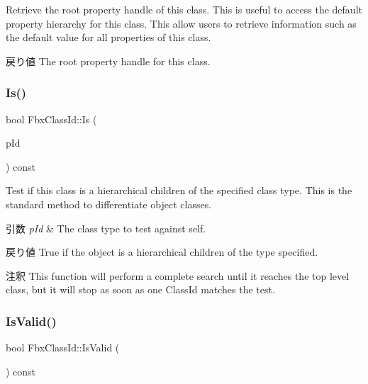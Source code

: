 Retrieve the root property handle of this class. This is useful to access the default property hierarchy for this class. This allow users to retrieve information such as the default value for all properties of this class. \begin{DoxyReturn}{戻り値}
The root property handle for this class. 
\end{DoxyReturn}
\mbox{\label{class_fbx_class_id_a276315faecc3a540664b49f6ba73b542}} 
\subsubsection{\texorpdfstring{Is()}{Is()}}
{\footnotesize\ttfamily bool Fbx\+Class\+Id\+::\+Is (\begin{DoxyParamCaption}\item[{const \hyperlink{class_fbx_class_id}{Fbx\+Class\+Id} \&}]{p\+Id }\end{DoxyParamCaption}) const}

Test if this class is a hierarchical children of the specified class type. This is the standard method to differentiate object classes. 
\begin{DoxyParams}{引数}
{\em p\+Id} & The class type to test against self. \\
\hline
\end{DoxyParams}
\begin{DoxyReturn}{戻り値}
True if the object is a hierarchical children of the type specified. 
\end{DoxyReturn}
\begin{DoxyRemark}{注釈}
This function will perform a complete search until it reaches the top level class, but it will stop as soon as one Class\+Id matches the test. 
\end{DoxyRemark}
\mbox{\label{class_fbx_class_id_a7ef887641b41040beea323813806046c}} 
\subsubsection{\texorpdfstring{Is\+Valid()}{IsValid()}}
{\footnotesize\ttfamily bool Fbx\+Class\+Id\+::\+Is\+Valid (\begin{DoxyParamCaption}{ }\end{DoxyParamCaption}) const}

